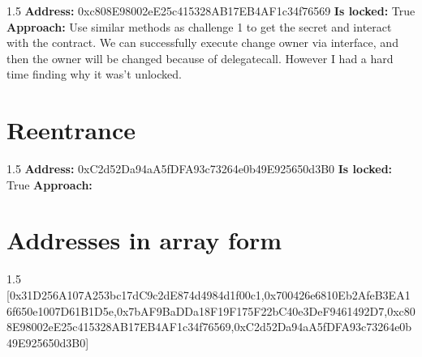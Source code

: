 \documentclass{article}
\begin{document}
\begin{spacing}{1.5}
    \textbf{Address:} 0xc808E98002eE25c415328AB17EB4AF1c34f76569 \newline
    \textbf{Is locked:} True \newline
    \textbf{Approach:} Use similar methods as challenge 1 to get the secret and interact with the contract. We can successfully execute change owner via interface, 
    and then the owner will be changed because of delegatecall. However I had a hard time finding why it was't unlocked. 

\end{spacing}
\section{Reentrance}

\begin{spacing}{1.5}
    \textbf{Address:} 0xC2d52Da94aA5fDFA93c73264e0b49E925650d3B0 \newline
    \textbf{Is locked:} True \newline
    \textbf{Approach:} 

\end{spacing}

\section*{Addresses in array form}

\begin{spacing}{1.5}
    [0x31D256A107A253bc17dC9c2dE874d4984d1f00c1,0x700426e6810Eb2AfeB3EA16f650e1007D61B1D5e,\newline 0x7bAF9BaDDa18F19F175F22bC40e3DeF9461492D7,0xc808E98002eE25c415328AB17EB4AF1c34f76569,\newline 0xC2d52Da94aA5fDFA93c73264e0b49E925650d3B0]

\end{spacing}
\end{document}
